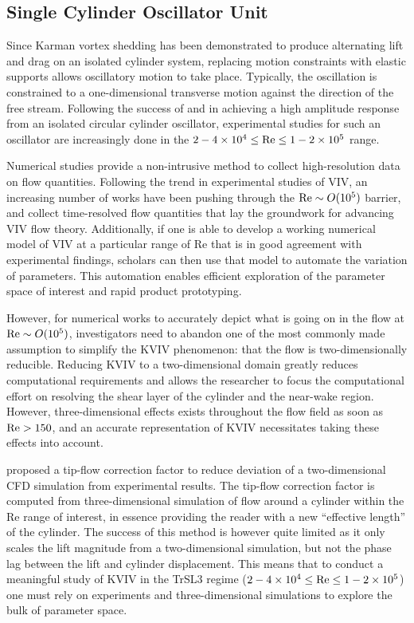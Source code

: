 \documentclass[oneside]{utmthesis}
\begin{document}
\subsection{Single Cylinder Oscillator Unit} \label{ssec:singleCylinderOscillator}
Since Karman vortex shedding has been demonstrated to produce alternating lift and drag on an isolated cylinder system, replacing motion constraints with elastic supports allows oscillatory motion to take place. Typically, the oscillation is constrained to a one-dimensional transverse motion against the direction of the free stream. Following the success of \citet{Raghavan2007a} and  \citet{Bernitsas2008b} in achieving a high amplitude response from an isolated circular cylinder oscillator, experimental studies for such an oscillator are increasingly done in the $2 - 4 \times 10^{4} \leq \text{Re} \leq 1 - 2 \times 10^{5}$ range.

Numerical studies provide a non-intrusive method to collect high-resolution data on flow quantities. Following the trend in experimental studies of VIV, an increasing number of works have been pushing through the $\text{Re} \sim O(10^{5})$ barrier, and collect time-resolved flow quantities that lay the groundwork for advancing VIV flow theory. Additionally, if one is able to develop a working numerical model of VIV at a particular range of Re that is in good agreement with experimental findings, scholars can then use that model to automate the variation of parameters. This automation enables efficient exploration of the parameter space of interest and rapid product prototyping.

However, for numerical works to accurately depict what is going on in the flow at $\text{Re} \sim O(10^{5})$, investigators need to abandon one of the most commonly made assumption to simplify the KVIV phenomenon: that the flow is two-dimensionally reducible. Reducing KVIV to a two-dimensional domain greatly reduces computational requirements and allows the researcher to focus the computational effort on resolving the shear layer of the cylinder and the near-wake region. However, three-dimensional effects exists throughout the flow field as soon as $\text{Re} > 150$, and an accurate representation of KVIV necessitates taking these effects into account.

\citet{Kinaci2016} proposed a tip-flow correction factor to reduce deviation of a two-dimensional CFD simulation from experimental results. The tip-flow correction factor is computed from three-dimensional simulation of flow around a cylinder within the Re range of interest, in essence providing the reader with a new ``effective length'' of the cylinder. The success of this method is however quite limited as it only scales the lift magnitude from a two-dimensional simulation, but not the phase lag between the lift and cylinder displacement. This means that to conduct a meaningful study of KVIV in the TrSL3 regime ($2 - 4 \times 10^{4} \leq \text{Re} \leq 1 - 2 \times 10^{5}$) one must rely on experiments and three-dimensional simulations to explore the bulk of parameter space.
\end{document}
